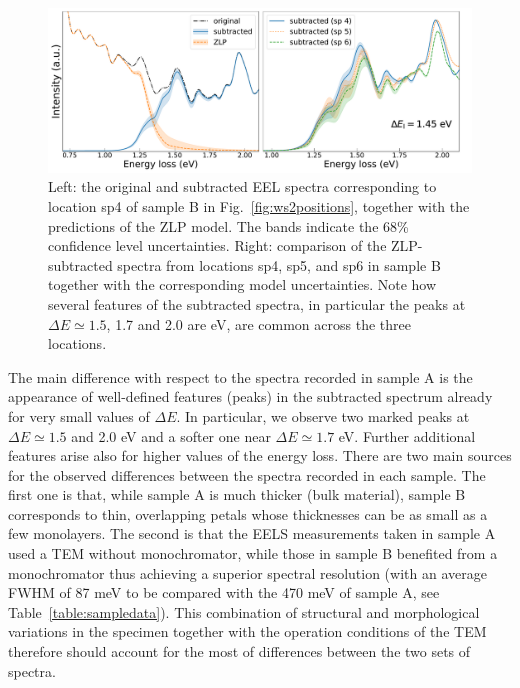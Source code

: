 \begin{figure}[t]
\begin{centering}
  \includegraphics[width=0.99\linewidth]{plots/subtractedEELS_plot_sampleB_sp4.pdf}
  \caption{Left: the original
     and subtracted EEL spectra corresponding to location sp4 of sample B in Fig.~\ref{fig:ws2positions},
     together with the predictions of the ZLP model.
     The bands indicate the 68\% confidence level uncertainties.
     Right: comparison of the ZLP-subtracted spectra from locations sp4, sp5, and sp6 in sample B
     together with the corresponding model uncertainties.
     Note how several features of the subtracted spectra, in particular
     the peaks at $\Delta E\simeq 1.5$,
    1.7 and 2.0 are eV, are common across the three locations.
  }
\label{fig:SubtractedEELS_plot_sp4}
\end{centering}
\end{figure}

The main difference with respect to the spectra recorded in sample A is the appearance
of well-defined features (peaks) in the subtracted spectrum already for
very small values of $\Delta E$.
%
In particular, we observe two marked peaks at $\Delta E\simeq 1.5$ and 2.0 eV and a
softer one near $\Delta E \simeq 1.7$ eV.
%
Further additional features arise also for higher values of the energy loss.
%
There are two main sources for the observed differences between the spectra recorded
in each sample.
%
The first one is that, while sample A is much thicker (bulk material), sample B corresponds
to thin, overlapping petals whose thicknesses can be as small as a few monolayers.
%
The second is that the EELS measurements taken in sample A used a TEM without monochromator,
while those in sample B benefited from a monochromator thus achieving a
superior
spectral resolution (with an average FWHM of 87 meV to be compared with the 470 meV of sample A, see
Table~\ref{table:sampledata}).
%
This combination of structural and morphological variations in the specimen together
with the operation conditions of the TEM therefore should account for the
most of differences
between the two sets of spectra.

